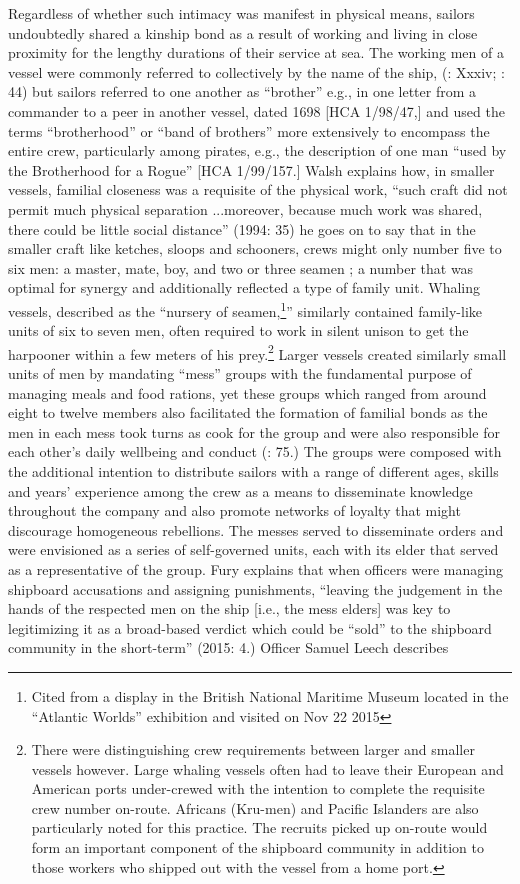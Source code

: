   Regardless of whether such intimacy was manifest in physical means, sailors undoubtedly shared a kinship bond as a result of working and living in close proximity for the lengthy durations of their service at sea. The working men of a vessel were commonly referred to collectively by the name of the ship, (\citealt{AdkinsAdkins2008}: Xxxiv; \citealt{Palmer1986}: 44) but sailors referred to one another as “brother” e.g., in one letter from a commander to a peer in another vessel, dated 1698 [HCA 1/98/47,] and used the terms “brotherhood” or “band of brothers” more extensively to encompass the entire crew, particularly among pirates, e.g., the description of one man “used by the Brotherhood for a Rogue” [HCA 1/99/157.] Walsh explains how, in smaller vessels, familial closeness was a requisite of the physical work, “such craft did not permit much physical separation ...moreover, because much work was shared, there could be little social distance” (1994: 35) he goes on to say that in the smaller craft like ketches, sloops and schooners, crews might only number five to six men: a master, mate, boy, and two or three seamen ; a number that was optimal for synergy and additionally reflected a type of family unit. Whaling vessels, described as the “nursery of seamen,\footnote{Cited from a display in the British National Maritime Museum located in the “Atlantic Worlds” exhibition and visited on Nov 22 2015}” similarly contained family-like units of six to seven men, often required to work in silent unison to get the harpooner within a few meters of his prey.\footnote{There were distinguishing crew requirements between larger and smaller vessels however. Large whaling vessels often had to leave their European and American ports under-crewed with the intention to complete the requisite crew number on-route. Africans (Kru-men) and Pacific Islanders are also particularly noted for this practice. The recruits picked up on-route would form an important component of the shipboard community in addition to those workers who shipped out with the vessel from a home port.}  Larger vessels created similarly small units of men by mandating “mess” groups with the fundamental purpose of managing meals and food rations, yet these groups which ranged from around eight to twelve members also facilitated the formation of familial bonds as the men in each mess took turns as cook for the group and were also responsible for each other’s daily wellbeing and conduct (\citealt{AdkinsAdkins2008}: 75.) The groups were composed with the additional intention to distribute sailors with a range of different ages, skills and years’ experience among the crew as a means to disseminate knowledge throughout the company and also promote networks of loyalty that might discourage homogeneous rebellions. The messes served to disseminate orders and were envisioned as a series of self-governed units, each with its elder that served as a representative of the group. Fury explains that when officers were managing shipboard accusations and assigning punishments, “leaving the judgement in the hands of the respected men on the ship [i.e., the mess elders] was key to legitimizing it as a broad-based verdict which could be “sold” to the shipboard community in the short-term” (2015: 4.) Officer Samuel Leech describes 